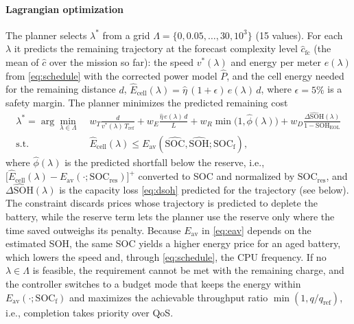 \paragraph{Lagrangian optimization}
The planner selects $\lambda^\ast$ from a grid
$\Lambda = \{0, 0.05, \dots, 30, 10^3\}$ (15 values). For each $\lambda$ it predicts the
remaining trajectory at the forecast complexity level $\hat c_{\mathrm{fc}}$ (the mean of $\hat c$ over the mission so far):
the speed $v^\ast(\lambda)$ and energy per meter $e(\lambda)$ from \eqref{eq:schedule} with the
corrected power model $\hat P$, and the cell energy needed for the remaining distance $d$,
$\hat E_{\mathrm{cell}}(\lambda) = \hat\eta\,(1+\epsilon)\, e(\lambda)\, d$, where
$\epsilon = 5\%$ is a safety margin. The planner minimizes the predicted remaining cost
\begin{equation}
\begin{aligned}
  \lambda^\ast = \arg\min_{\lambda \in \Lambda}\; &
  w_T \frac{d}{v^\ast(\lambda)\, T_{\mathrm{ref}}}
  + w_E \frac{\hat\eta\, e(\lambda)\, d}{L}
  + w_R \min\!\big(1, \hat\phi(\lambda)\big)
  + w_D \frac{\widehat{\Delta\mathrm{SOH}}(\lambda)}{1 - \mathrm{SOH}_{\mathrm{EOL}}} \\
  \text{s.t.} \quad &
  \hat E_{\mathrm{cell}}(\lambda) \leq E_{\mathrm{av}}(\widehat{\mathrm{SOC}}, \widehat{\mathrm{SOH}}; \mathrm{SOC}_{\mathrm{f}}),
\end{aligned}
  \label{eq:lambda}
\end{equation}
where $\hat\phi(\lambda)$ is the predicted shortfall below the reserve, i.e.,
$\big[\hat E_{\mathrm{cell}}(\lambda) - E_{\mathrm{av}}(\cdot; \mathrm{SOC}_{\mathrm{res}})\big]^+$
converted to \ac{SOC} and normalized by $\mathrm{SOC}_{\mathrm{res}}$, and
$\widehat{\Delta\mathrm{SOH}}(\lambda)$ is the capacity loss \eqref{eq:dsoh} predicted for the
trajectory (see below).
The constraint discards prices whose trajectory is predicted to deplete the battery,
while the reserve term lets the planner use the reserve only where the time saved outweighs its penalty.
Because $E_{\mathrm{av}}$ in \eqref{eq:eav} depends on the estimated \ac{SOH}, the same
\ac{SOC} yields a higher energy price for an aged battery, which lowers the speed
and, through \eqref{eq:schedule}, the \ac{CPU} frequency.
If no $\lambda \in \Lambda$ is feasible, the requirement cannot be met with the remaining
charge, and the controller switches to a budget mode that keeps the energy within
$E_{\mathrm{av}}(\cdot; \mathrm{SOC}_{\mathrm{f}})$ and maximizes the achievable throughput
ratio $\min(1, q / q_{\mathrm{ref}})$, i.e., completion takes priority over \ac{QoS}.

